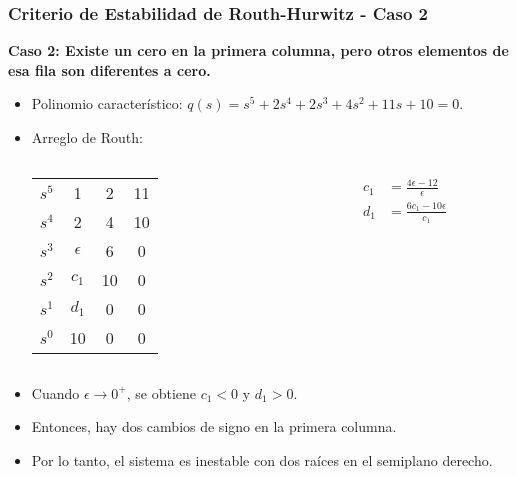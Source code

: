 \documentclass[aspectratio=169]{beamer}
\theoremstyle{definition}
\theoremstyle{plain}
\theoremstyle{remark}
\begin{document}
\begin{frame}[<+->]\frametitle{Criterio de Estabilidad de Routh-Hurwitz - Caso 2}
\textbf{Caso 2: Existe un cero en la primera columna, pero otros elementos de esa fila son diferentes a cero.}
\begin{itemize}
	\item Polinomio característico: $q(s) = s^5 + 2s^4 + 2s^3 + 4s^2 + 11s + 10 = 0$.
	\item Arreglo de Routh:\\
	\centering	
	\begin{columns}
	\begin{column}{0.2\textwidth}
	\begin{tabular}{c|ccc}
		$s^5$ & 1 & 2 & 11\\
		$s^4$ & 2 & 4 & 10\\
		$s^3$ & $\epsilon$ & 6 & 0\\
		$s^2$ & $c_1$ & 10 & 0\\
		$s^1$ & $d_1$ & 0 & 0\\
		$s^0$ & 10 & 0 & 0
	\end{tabular}
	\end{column}	
	\begin{column}{0.2\textwidth}
	\begin{align*}
		c_1 &= \frac{4\epsilon - 12}{\epsilon}\\
		d_1 &= \frac{6c_1 - 10\epsilon}{c_1}
	\end{align*}
	\end{column}	
	\end{columns}
	\item Cuando $\epsilon \rightarrow 0^+$, se obtiene $c_1 < 0$ y $d_1 > 0$.
	\item Entonces, hay dos cambios de signo en la primera columna.
	\item Por lo tanto, el sistema es inestable con dos raíces en el semiplano derecho.
\end{itemize}
\end{frame}
\end{document}
